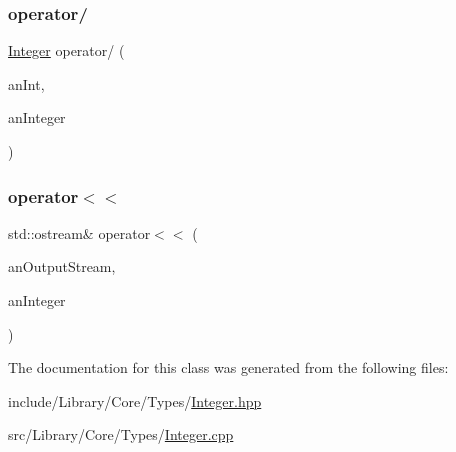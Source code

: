 \subsubsection{\texorpdfstring{operator/}{operator/}}
{\footnotesize\ttfamily \hyperlink{classlibrary_1_1core_1_1types_1_1_integer}{Integer} operator/ (\begin{DoxyParamCaption}\item[{const \hyperlink{classlibrary_1_1core_1_1types_1_1_integer_a623afb1580f870fd8a1997b1c12c917d}{Integer\+::\+Value\+Type} \&}]{an\+Int,  }\item[{const \hyperlink{classlibrary_1_1core_1_1types_1_1_integer}{Integer} \&}]{an\+Integer }\end{DoxyParamCaption})\hspace{0.3cm}{\ttfamily [friend]}}

\mbox{\label{classlibrary_1_1core_1_1types_1_1_integer_aec29fc1731201932ab34cfe2ec83fbc9}} 
\subsubsection{\texorpdfstring{operator$<$$<$}{operator<<}}
{\footnotesize\ttfamily std\+::ostream\& operator$<$$<$ (\begin{DoxyParamCaption}\item[{std\+::ostream \&}]{an\+Output\+Stream,  }\item[{const \hyperlink{classlibrary_1_1core_1_1types_1_1_integer}{Integer} \&}]{an\+Integer }\end{DoxyParamCaption})\hspace{0.3cm}{\ttfamily [friend]}}



The documentation for this class was generated from the following files\+:\begin{DoxyCompactItemize}
\item 
include/\+Library/\+Core/\+Types/\hyperlink{_integer_8hpp}{Integer.\+hpp}\item 
src/\+Library/\+Core/\+Types/\hyperlink{_integer_8cpp}{Integer.\+cpp}\end{DoxyCompactItemize}
